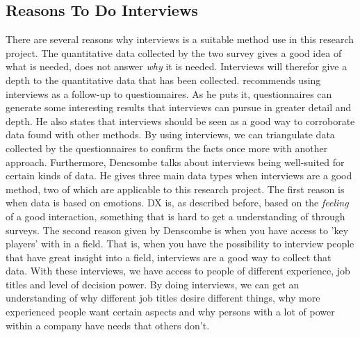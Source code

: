 \documentclass{cslthse-msc}
\begin{document}
    \subsection{Reasons To Do Interviews}
    There are several reasons why interviews is a suitable method use in this research project.
    The quantitative data collected
    by the two survey gives a good idea of what is needed, does not answer \textit{why} it is needed.
    Interviews will therefor give a depth to the quantitative data that has been collected.
    \citet{denscombe} recommends using interviews as a follow-up to questionnaires. As he puts it,
    questionnaires can generate some interesting results that interviews can pursue
    in greater detail and depth. He also states that interviews should be seen as a good way
    to corroborate data found with other methods. By using interviews, we can triangulate data
    collected by the questionnaires to confirm the facts once more with another approach.
    Furthermore, Dencsombe talks about interviews being well-suited for certain kinds of data.
    He gives three main data types when interviews are a good method,
    two of which are applicable to this research project. The first reason is
    when data is based on emotions. DX is, as described before, based on the \textit{feeling}
    of a good interaction, something that is hard to get a understanding of through
    surveys. The second reason given by Denscombe is when you have access to 'key players'
    with in a field. That is, when you have the possibility to interview people
    that have great insight into a field, interviews are a good way to collect that data.
    With these interviews, we have access to people of different experience, job titles
    and level of decision power. By doing interviews, we can get an understanding
    of why different job titles desire different things, why more experienced people
    want certain aspects and why persons with a lot of power within a company
    have needs that others don't.
\end{document}

